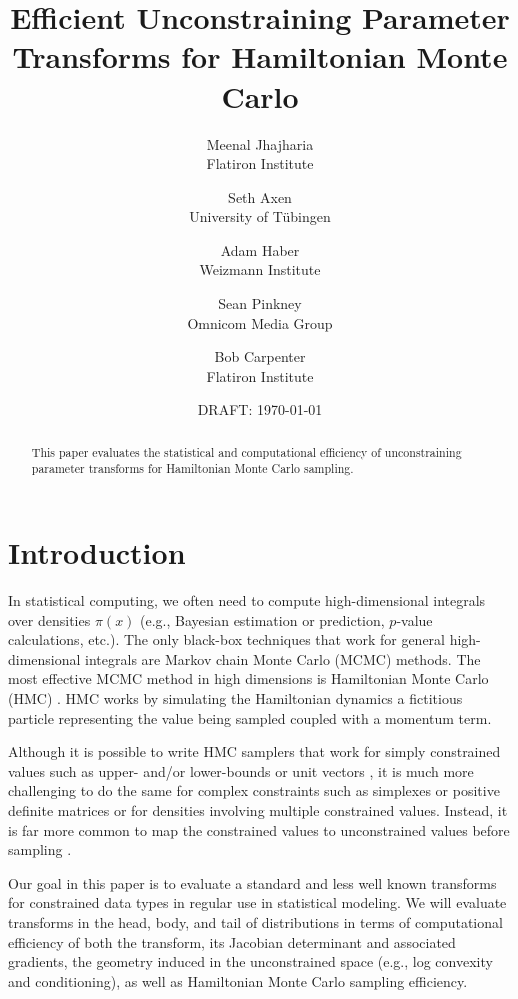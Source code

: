 \documentclass[11pt]{article}
\begin{document}
\title{Efficient Unconstraining
  Parameter Transforms for Hamiltonian Monte Carlo}
\author{Meenal Jhajharia \\ \small Flatiron Institute 
\and Seth Axen \\ \small University of T\"ubingen 
\and Adam Haber \\ \small Weizmann Institute 
\and Sean Pinkney \\ \small Omnicom Media Group
\and Bob Carpenter \\ \small Flatiron Institute}
\date{DRAFT: \today}
\maketitle


\begin{abstract}
  \noindent
  This paper evaluates the statistical and computational
  efficiency of unconstraining parameter transforms for Hamiltonian
  Monte Carlo sampling.
\end{abstract}

\section{Introduction}

In statistical computing, we often need to compute high-dimensional
integrals over densities $\pi(x)$ (e.g., Bayesian estimation or
prediction, $p$-value calculations, etc.).  The only black-box
techniques that work for general high-dimensional integrals are
Markov chain Monte Carlo (MCMC) methods.  The most effective MCMC
method in high dimensions is Hamiltonian Monte Carlo (HMC) \cite{neal2011mcmc}.
HMC works by simulating the Hamiltonian dynamics  a fictitious particle
representing the value being sampled coupled with a momentum term.

Although it is possible to write HMC samplers that work for simply
constrained values such as upper- and/or lower-bounds
\cite{neal2011mcmc} or unit vectors \cite{byrne2013geodesic}, it is
much more challenging to do the same for complex constraints such as
simplexes or positive definite matrices or for densities involving
multiple constrained values.  Instead, it is far more common to map
the constrained values to unconstrained values before sampling
\cite{JSSv076i01, radul2021base, fjelde2020bijectors}.  

Our goal in this paper is to evaluate a standard and less well known transforms for constrained data types in regular use in statistical modeling.  We will evaluate transforms in the head, body, and tail of distributions in terms of computational efficiency of both the transform, its Jacobian determinant and associated gradients, the geometry induced in the unconstrained space (e.g., log convexity and conditioning), as well as Hamiltonian Monte Carlo sampling efficiency. 
\end{document}
